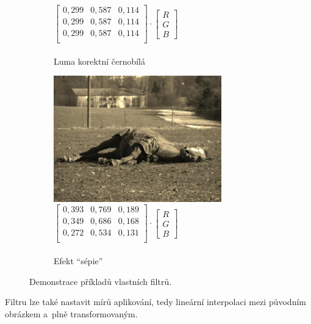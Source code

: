 \documentclass[11pt, a4paper, titlepage]{article}
\renewcommand{\uv}[1]{``#1''}
\begin{document}
\begin{figure}[h]
\begin{subfigure}[t]{0.3\textwidth}
        \caption{
            $
            \begin{bmatrix}
                0,299 & 0,587 & 0,114 \\
                0,299 & 0,587 & 0,114 \\
                0,299 & 0,587 & 0,114 \\
            \end{bmatrix}
            \cdot
            \begin{bmatrix}R\\G\\B\end{bmatrix}
            $\\\\Luma korektní černobílá
        }
    \end{subfigure}
    \hspace{0.1cm}
    \begin{subfigure}[t]{0.3\textwidth}
        \centering
        \vskip 0pt
        \includegraphics[width=0.8\textwidth]{horse_sepia.jpg}
        \caption{
            $
            \begin{bmatrix}
                0,393 & 0,769 & 0,189 \\
                0,349 & 0,686 & 0,168 \\
                0,272 & 0,534 & 0,131 \\
            \end{bmatrix}
            \cdot
            \begin{bmatrix}R\\G\\B\end{bmatrix}
            $\\\\Efekt \uv{sépie}\cite{Howtocon48:online}
        }
    \end{subfigure}
    \caption{Demonstrace příkladů vlastních filtrů.}
    \label{fig:custom-filters}
\end{figure}
Filtru lze také nastavit mírů aplikování, tedy lineární interpolaci mezi původním obrázkem a~plně transformovaným.
\end{document}
